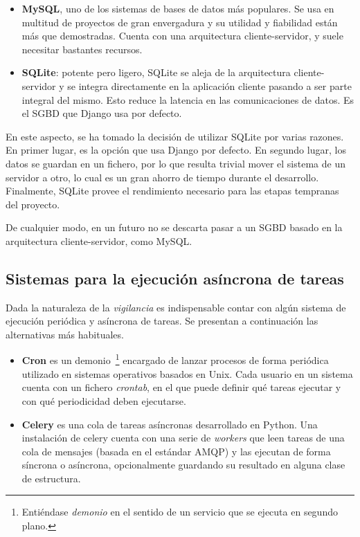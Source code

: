 \begin{itemize}
\item \textbf{MySQL}\cite{mysql}, uno de los sistemas de bases de datos más populares. Se
  usa en multitud de proyectos de gran envergadura y su utilidad y fiabilidad
  están más que demostradas. Cuenta con una arquitectura cliente-servidor, y
  suele necesitar bastantes recursos.

\item \textbf{SQLite}\cite{sqlite}: potente pero ligero, SQLite se aleja de la arquitectura
  cliente-servidor y se integra directamente en la aplicación cliente pasando a
  ser parte integral del mismo. Esto reduce la latencia en las comunicaciones de
  datos. Es el SGBD que Django usa por defecto.

\end{itemize}

En este aspecto, se ha tomado la decisión de utilizar SQLite por varias
razones. En primer lugar, es la opción que usa Django por defecto. En segundo
lugar, los datos se guardan en un fichero, por lo que resulta trivial mover el
sistema de un servidor a otro, lo cual es un gran ahorro de tiempo durante el
desarrollo. Finalmente, SQLite provee el rendimiento necesario para las etapas
tempranas del proyecto.

De cualquier modo, en un futuro no se descarta pasar a un SGBD basado en la
arquitectura cliente-servidor, como MySQL.

\subsection{Sistemas para la ejecución asíncrona de tareas}

Dada la naturaleza de la \textit{vigilancia} es indispensable contar con algún
sistema de ejecución periódica y asíncrona de tareas. Se presentan a
continuación las alternativas más habituales.

\begin{itemize}
\item \textbf{Cron}\cite{cron} es un demonio~\footnote{Entiéndase \textit{demonio} en el
    sentido de un servicio que se ejecuta en segundo plano.} encargado de lanzar
  procesos de forma periódica utilizado en sistemas operativos basados en
  Unix. Cada usuario en un sistema cuenta con un fichero \textit{crontab}, en el
  que puede definir qué tareas ejecutar y con qué periodicidad deben ejecutarse. 

\item \textbf{Celery}\cite{celery} es una cola de tareas asíncronas desarrollado en
  Python. Una instalación de celery cuenta con una serie de \textit{workers} que
  leen tareas de una cola de mensajes (basada en el estándar \ac{AMQP}) y las
  ejecutan de forma síncrona o asíncrona, opcionalmente guardando su resultado
  en alguna clase de estructura. 

\end{itemize}

